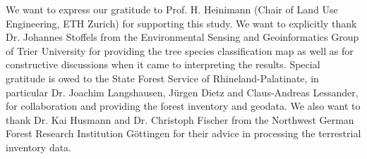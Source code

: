 We want to express our gratitude to Prof. H. Heinimann (Chair of Land Use Engineering, ETH Zurich) for supporting this study. We want to explicitly thank Dr. Johannes Stoffels from the Environmental Sensing and Geoinformatics Group of Trier University for providing the tree species classification map as well as for constructive discussions when it came to interpreting the results. Special gratitude is owed to the State Forest Service of Rhineland-Palatinate, in particular Dr. Joachim Langshausen, J{\"u}rgen Dietz and Claus-Andreas Lessander, for collaboration and providing the forest inventory and geodata. We also want to thank Dr. Kai Husmann and Dr. Christoph Fischer from the Northwest German Forest Research Institution G{\"o}ttingen for their advice in processing the terrestrial inventory data.

